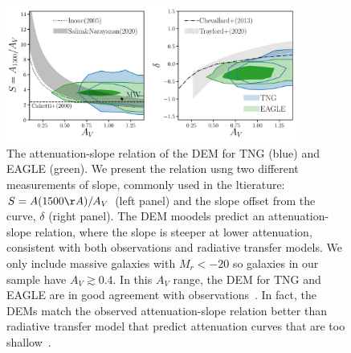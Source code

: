 \begin{figure}
\begin{center}
    \includegraphics[width=0.85\textwidth]{figs/abc_slope_AV.pdf}
    \caption{\label{fig:slope}
    The attenuation-slope relation of the DEM for TNG (blue) and EAGLE (green).
    We present the relation usng two different measurements of slope, 
    commonly used in the ltierature: $S = A(1500\AA)/A_V$ (left panel) and
    the slope offset from the \cite{calzetti2001} curve, $\delta$ (right panel).
    The DEM moodels predict an attenuation-slope relation, where the slope is
    steeper at lower attenuation, consistent with both observations and
    radiative transfer models. We only include massive galaxies with $M_r <
    -20$ so galaxies in our sample have $A_V \gtrsim 0.4$. In this $A_V$ range,
    the DEM for TNG and EAGLE are in good agreement with observations~\cite{salim2020}. 
    In fact, the DEMs match the observed attenuation-slope relation better 
    than radiative transfer model that predict attenuation curves that are
    too shallow~\citep{inoue2005, chevallard2013, trayford2020}.
    }
\end{center}
\end{figure}


